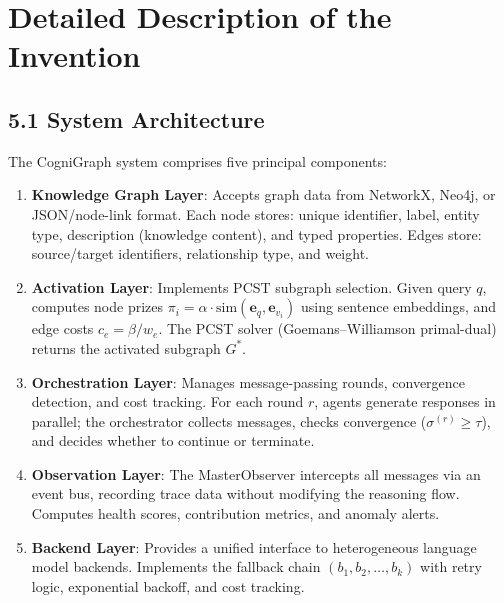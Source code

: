 \documentclass[a4paper,12pt]{article}
\begin{document}
\vspace{4mm}


\section*{Detailed Description of the Invention}

\subsection*{5.1 System Architecture}

\noindent The CogniGraph system comprises five principal components:

\begin{enumerate}[nosep,leftmargin=2em]
\item \textbf{Knowledge Graph Layer}: Accepts graph data from NetworkX, Neo4j, or JSON/node-link format. Each node stores: unique identifier, label, entity type, description (knowledge content), and typed properties. Edges store: source/target identifiers, relationship type, and weight.

\item \textbf{Activation Layer}: Implements PCST subgraph selection. Given query $q$, computes node prizes $\pi_i = \alpha \cdot \mathrm{sim}(\mathbf{e}_q, \mathbf{e}_{v_i})$ using sentence embeddings, and edge costs $c_e = \beta / w_e$. The PCST solver (Goemans--Williamson primal-dual) returns the activated subgraph $G^*$.

\item \textbf{Orchestration Layer}: Manages message-passing rounds, convergence detection, and cost tracking. For each round $r$, agents generate responses in parallel; the orchestrator collects messages, checks convergence ($\sigma^{(r)} \geq \tau$), and decides whether to continue or terminate.

\item \textbf{Observation Layer}: The MasterObserver intercepts all messages via an event bus, recording trace data without modifying the reasoning flow. Computes health scores, contribution metrics, and anomaly alerts.

\item \textbf{Backend Layer}: Provides a unified interface to heterogeneous language model backends. Implements the fallback chain $(b_1, b_2, \ldots, b_k)$ with retry logic, exponential backoff, and cost tracking.
\end{enumerate}
\end{document}
